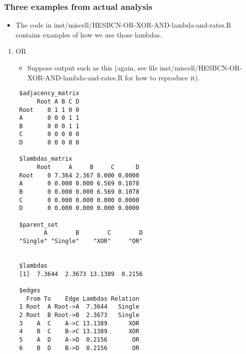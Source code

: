 \documentclass[11pt]{article}
\begin{document}
\subsubsection{Three examples from actual analysis}
\label{sec:orgdc3f991}
\begin{itemize}
\item The code in inst/miscell/HESBCN-OR-XOR-AND-lambda-and-rates.R contains examples of how we use those lambdas.
\end{itemize}
\begin{enumerate}
\item OR
\label{sec:org9d47997}
\begin{itemize}
\item Suppose output such as this (again, see file inst/miscell/HESBCN-OR-XOR-AND-lambda-and-rates.R for how to reproduce it).
\end{itemize}

\begin{verbatim}
 $adjacency_matrix
      Root A B C D
 Root    0 1 1 0 0
 A       0 0 0 1 1
 B       0 0 0 1 1
 C       0 0 0 0 0
 D       0 0 0 0 0

 $lambdas_matrix
      Root     A     B     C      D
 Root    0 7.364 2.367 0.000 0.0000
 A       0 0.000 0.000 6.569 0.1078
 B       0 0.000 0.000 6.569 0.1078
 C       0 0.000 0.000 0.000 0.0000
 D       0 0.000 0.000 0.000 0.0000

 $parent_set
        A        B        C        D 
 "Single" "Single"    "XOR"     "OR" 


 $lambdas
 [1]  7.3644  2.3673 13.1389  0.2156

 $edges
   From To    Edge Lambdas Relation
 1 Root  A Root->A  7.3644   Single
 2 Root  B Root->B  2.3673   Single
 3    A  C    A->C 13.1389      XOR
 4    B  C    B->C 13.1389      XOR
 5    A  D    A->D  0.2156       OR
 6    B  D    B->D  0.2156       OR
\end{verbatim}


\end{enumerate}
\end{document}
